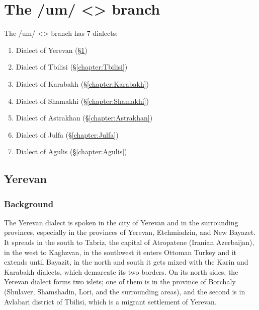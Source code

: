 \part{The /um/ <> branch}

The /um/ <> branch has 7 dialects:

\begin{enumerate}
	\item Dialect of Yerevan (\S\ref{chapter:Yerevan})
	\item Dialect of Tbilisi (\S\ref{chapter:Tbilisi})
	\item Dialect of Karabakh (\S\ref{chapter:Karabakh})
	\item Dialect of Shamakhi (\S\ref{chapter:Shamakhi})
	\item Dialect of Astrakhan (\S\ref{chapter:Astrakhan})
	\item Dialect of Julfa (\S\ref{chapter:Julfa})
	\item Dialect of Agulis (\S\ref{chapter:Agulis})
	
\end{enumerate}




\chapter{Yerevan}\label{chapter:Yerevan}



\begin{adjarianpage}\label{page:37}\end{adjarianpage}%

\section{Background}
The Yerevan dialect is spoken in the city of Yerevan and in the surrounding provinces, especially in the provinces of Yerevan, Etchmiadzin, and New Bayazet. It spreads in the south   to Tabriz, the capital of Atropatene (Iranian Azerbaijan), in the west to Kaghzvan, in the southwest   it enters Ottoman Turkey and it extends until Bayazit, in the north and south  it gets mixed with the Karin and Karabakh dialects, which demarcate its two borders. On its north sides, the Yerevan dialect forms two islets; one of them is in the province of Borchaly (Shulaver, Shamshadin, Lori, and the surrounding areas), and the second is in Avlabari district of Tbilisi, which is a migrant settlement of Yerevan. 


